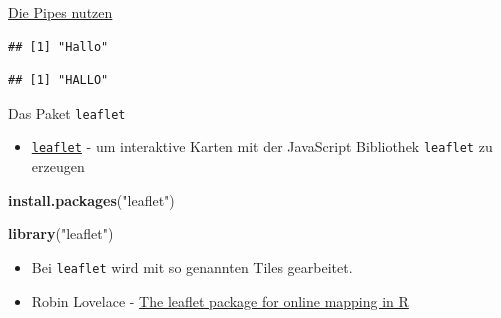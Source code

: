 \documentclass[ignorenonframetext,]{beamer}
\newenvironment{Shaded}{}{}
\newcommand{\KeywordTok}[1]{\textcolor[rgb]{0.00,0.44,0.13}{\textbf{{#1}}}}
\newcommand{\DecValTok}[1]{\textcolor[rgb]{0.25,0.63,0.44}{{#1}}}
\newcommand{\StringTok}[1]{\textcolor[rgb]{0.25,0.44,0.63}{{#1}}}
\newcommand{\NormalTok}[1]{{#1}}
\providecommand{\tightlist}{%
\setlength{\itemsep}{0pt}\setlength{\parskip}{0pt}}
\begin{document}
\begin{frame}[fragile]{\href{https://www.r-bloggers.com/more-readable-code-with-pipes-in-r/}{Die
Pipes nutzen}}

\begin{Shaded}
\end{Shaded}

\begin{verbatim}
## [1] "Hallo"
\end{verbatim}

\begin{Shaded}
\end{Shaded}

\begin{verbatim}
## [1] "HALLO"
\end{verbatim}

\end{frame}

\begin{frame}[fragile]{Das Paket \texttt{leaflet}}

\begin{itemize}
\tightlist
\item
  \href{https://rstudio.github.io/leaflet/}{\texttt{leaflet}} - um
  interaktive Karten mit der JavaScript Bibliothek \texttt{leaflet} zu
  erzeugen
\end{itemize}

\begin{Shaded}
\begin{Highlighting}[]
\KeywordTok{install.packages}\NormalTok{(}\StringTok{"leaflet"}\NormalTok{)}
\end{Highlighting}
\end{Shaded}

\begin{Shaded}
\begin{Highlighting}[]
\KeywordTok{library}\NormalTok{(}\StringTok{"leaflet"}\NormalTok{)}
\end{Highlighting}
\end{Shaded}

\begin{itemize}
\item
  Bei \texttt{leaflet} wird mit so genannten Tiles gearbeitet.
\item
  Robin Lovelace -
  \href{http://robinlovelace.net/r/2015/02/01/leaflet-r-package.html}{The
  leaflet package for online mapping in R}
\end{itemize}

\end{frame}
\end{document}
